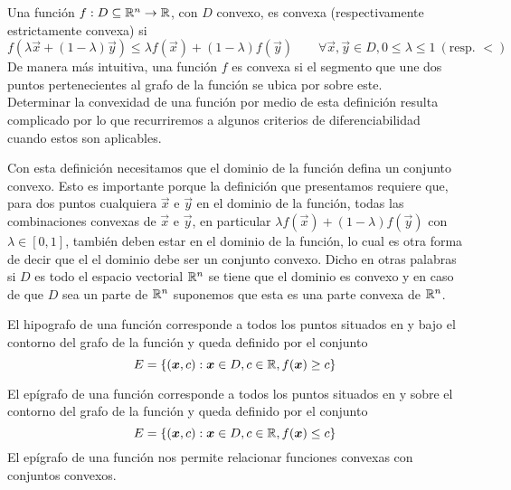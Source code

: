 \begin{definicion}\label{convexidad}
Una funci\'on $f:D\subseteq \mathbb{R}^n \to \mathbb{R}$, con $D$ convexo, es convexa (respectivamente estrictamente convexa) si
$$f(\lambda \vec{x} + (1-\lambda) \vec{y}) \leq \lambda f(\vec{x}) + (1-\lambda) f(\vec{y}) \qquad \forall \vec{x},\vec{y} \in D , 0\leq \lambda \leq 1 \: (\text{resp. }<)$$
De manera m\'as intuitiva, una funci\'on $f$ es convexa si el segmento que une dos puntos pertenecientes al grafo de la funci\'on se ubica por sobre este.
\\Determinar la convexidad de una funci\'on por medio de esta definici\'on resulta complicado por lo que recurriremos a algunos criterios de diferenciabilidad cuando estos son aplicables.
\end{definicion}

\begin{nota}
Con esta definici\'on necesitamos que el dominio de la funci\'on defina un conjunto convexo. Esto es importante porque la definici\'on que presentamos requiere que, para dos puntos cualquiera $\vec{x}$ e $\vec{y}$ en el dominio de la funci\'on, todas las combinaciones convexas de $\vec{x}$ e $\vec{y}$, en particular $\lambda f(\vec{x}) + (1-\lambda) f(\vec{y})$ con $\lambda \in [0,1]$, tambi\'en deben estar en el dominio de la funci\'on, lo cual es otra forma de decir que el el dominio debe ser un conjunto convexo. Dicho en otras palabras si $D$ es todo el espacio vectorial $\mathbb{R}^n$ se tiene que el dominio es convexo y en caso de que $D$ sea un parte de $\mathbb{R}^n$ suponemos que esta es una parte convexa de $\mathbb{R}^n$.
\end{nota}

\begin{definicion}
El hipografo de una funci\'on corresponde a todos los puntos situados en y bajo el contorno del grafo de la funci\'on y queda definido por el conjunto 
\begin{equation*}
E=\{(\boldsymbol{x},c) : \boldsymbol{x}\in D , c\in \mathbb{R} , f(\boldsymbol{x})\geq c\}
\end{equation*}
\end{definicion}

\begin{definicion}\label{epi}
El ep\'igrafo de una funci\'on  corresponde a todos los puntos situados en y sobre el contorno del grafo de la funci\'on y queda definido por el conjunto 
\begin{equation*}
E=\{(\boldsymbol{x},c) : \boldsymbol{x}\in D , c\in \mathbb{R} , f(\boldsymbol{x})\leq c\}
\end{equation*}
El ep\'igrafo de una funci\'on nos permite relacionar funciones convexas con conjuntos convexos.
\end{definicion}

